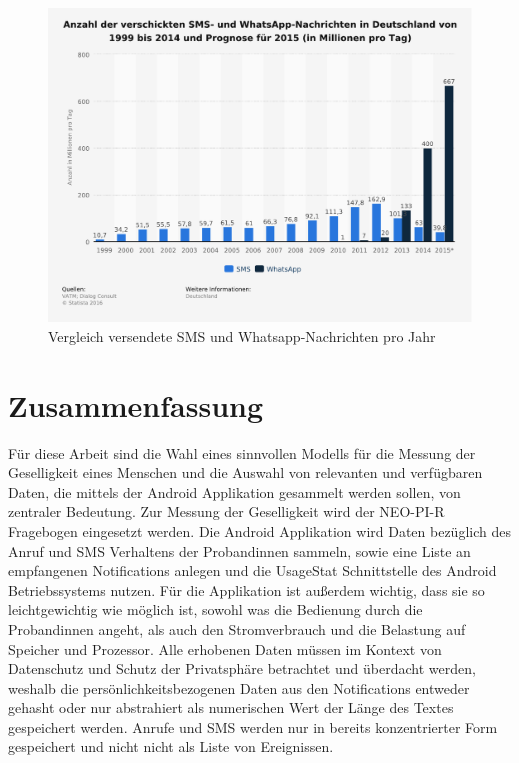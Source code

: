\begin{figure}[h]
    \centering
    \includegraphics[width=\textwidth]{images/statistic_id3624_anzahl-gesendeter-sms-nachrichten-pro-tag-in-deutschland-bis-2015}
    \caption{Vergleich versendete SMS und Whatsapp-Nachrichten pro Jahr\cite{whatsappVergleichSMS}}
    \label{smsvswhatsapp}
\end{figure}


\section{Zusammenfassung}
\label{ch:Analyse:sec:zusammenfassung}

Für diese Arbeit sind die Wahl eines sinnvollen Modells für die Messung der Geselligkeit eines Menschen 
und die Auswahl von relevanten und verfügbaren Daten, die mittels der Android Applikation gesammelt werden sollen, von zentraler Bedeutung.
Zur Messung der Geselligkeit wird der NEO-PI-R Fragebogen eingesetzt werden.
Die Android Applikation wird Daten bezüglich des Anruf und SMS Verhaltens der Probandinnen sammeln,
sowie eine Liste an empfangenen Notifications anlegen und die UsageStat Schnittstelle des Android Betriebssystems nutzen.
Für die Applikation ist außerdem wichtig, dass sie so leichtgewichtig wie möglich ist, 
sowohl was die Bedienung durch die Probandinnen angeht, als auch den Stromverbrauch und die Belastung auf Speicher und Prozessor.
Alle erhobenen Daten müssen im Kontext von Datenschutz und Schutz der Privatsphäre betrachtet und überdacht werden, weshalb die persönlichkeitsbezogenen Daten aus den Notifications entweder gehasht oder nur abstrahiert als numerischen Wert der Länge des Textes gespeichert werden.
Anrufe und SMS werden nur in bereits konzentrierter Form gespeichert und nicht nicht als Liste von Ereignissen.

